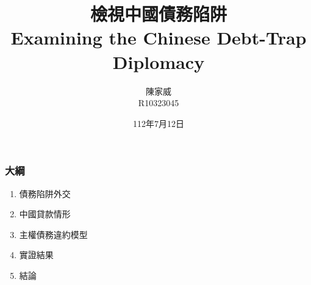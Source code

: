 \documentclass[mathserif]{beamer}
\title{檢視中國債務陷阱\\Examining the Chinese Debt-Trap Diplomacy}
\author{陳家威\\{\small R10323045}}
\date{112年7月12日}
\begin{document}
    \begin{frame}
        \maketitle
    \end{frame}

    \begin{frame}
        \frametitle{大綱}
            \begin{enumerate}
                \item 債務陷阱外交
                \item 中國貸款情形
                \item 主權債務違約模型
                \item 實證結果
                \item 結論
            \end{enumerate}
    \end{frame}
\end{document}
